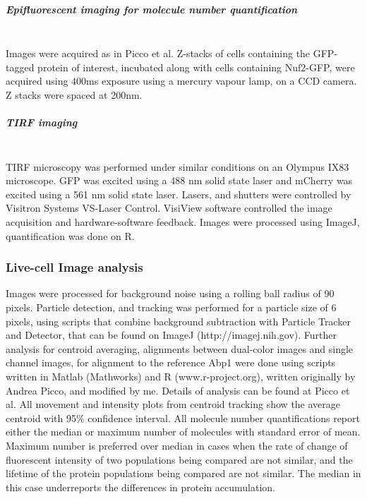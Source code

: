 \subparagraph{Epifluorescent imaging for molecule number quantification}
			\mbox{}\\
Images were acquired as in Picco et al. Z-stacks of cells containing the GFP-tagged protein of interest, incubated along with cells containing Nuf2-GFP, were acquired using 400ms exposure using a mercury vapour lamp, on a CCD camera. Z stacks were spaced at 200nm. 

\subparagraph{TIRF imaging}
			\mbox{}\\
TIRF microscopy was performed under similar conditions on an Olympus IX83 microscope. GFP was excited using a 488 nm solid state laser and mCherry was excited using a 561 nm solid state laser. Lasers, and shutters were controlled by Visitron Systems VS-Laser Control. VisiView software controlled the image acquisition and hardware-software feedback.
Images were processed using ImageJ, quantification was done on R.

\subsubsection{Live-cell Image analysis}
Images were processed for background noise using a rolling ball radius of 90 pixels. Particle detection, and tracking was performed for a particle size of 6 pixels, using scripts that combine background subtraction with Particle Tracker and Detector, that can be found on ImageJ (http://imagej.nih.gov). Further analysis for centroid averaging, alignments between dual-color images and single channel images, for alignment to the reference Abp1 were done using scripts written in Matlab (Mathworks) and R (www.r-project.org), written originally by Andrea Picco, and modified by me. Details of analysis can be found at Picco et al. All movement and intensity plots from centroid tracking show the average centroid with 95\% confidence interval. All molecule number quantifications report either the median or maximum number of molecules with standard error of mean. Maximum number is preferred over median in cases when the rate of change of fluorescent intensity of two populations being compared are not similar, and the lifetime of the protein populations being compared are not similar. The median in this case underreports the differences in protein accumulation. 

